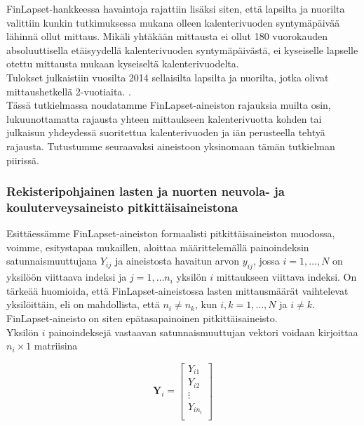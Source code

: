 \documentclass[finnish]{docopts}
\begin{document}
FinLapset-hankkeessa havaintoja rajattiin lisäksi siten, että lapsilta ja nuorilta valittiin kunkin tutkimuksessa mukana olleen kalenterivuoden syntymäpäivää lähinnä ollut mittaus. Mikäli yhtäkään mittausta ei ollut 180 vuorokauden absoluuttisella etäisyydellä kalenterivuoden syntymäpäivästä, ei kyseiselle lapselle otettu mittausta mukaan kyseiseltä kalenterivuodelta. \\

Tulokset julkaistiin vuosilta 2014 sellaisilta lapsilta ja nuorilta, jotka olivat mittaushetkellä 2-vuotiaita. \citep{finlapsetrekisteri}. \\

Tässä tutkielmassa noudatamme FinLapset-aineiston rajauksia muilta osin, lukuunottamatta rajausta yhteen mittaukseen kalenterivuotta kohden tai julkaisun yhdeydessä suoritettua kalenterivuoden ja iän perusteella tehtyä rajausta. Tutustumme seuraavaksi aineistoon yksinomaan tämän tutkielman piirissä.\\

\subsubsection{Rekisteripohjainen lasten ja nuorten neuvola- ja kouluterveysaineisto pitkittäisaineistona}
\label{ssb:rekpitkittais}

Esittäessämme FinLapset-aineiston formaalisti pitkittäisaineiston muodossa, voimme, \cite{fitzmaurice11} esitystapaa mukaillen, aloittaa määrittelemällä painoindeksin satunnaismuuttujana $Y_{ij}$ ja aineistosta havaitun arvon $y_{ij}$, jossa $i = 1, \dots, N$ on yksilöön viittaava indeksi ja $j = 1, \dots n_i$ yksilön $i$ mittaukseen viittava indeksi. On tärkeää huomioida, että FinLapset-aineistossa lasten mittausmäärät vaihtelevat yksilöittäin, eli on mahdollista, että $n_i \neq n_k$, kun $i,k = 1,\dots, N$ ja $i \neq k$. FinLapset-aineisto on siten epätasapainoinen pitkittäisaineisto.\\

Yksilön $i$ painoindeksejä vastaavan satunnaismuuttujan vektori voidaan kirjoittaa $n_i \times 1$ matriisina

$$
\bm{Y}_i = 
\begin{bmatrix}
Y_{i1} \\
Y_{i2} \\
\vdots \\
Y_{in_i} \\
\end{bmatrix}
$$
\end{document}
